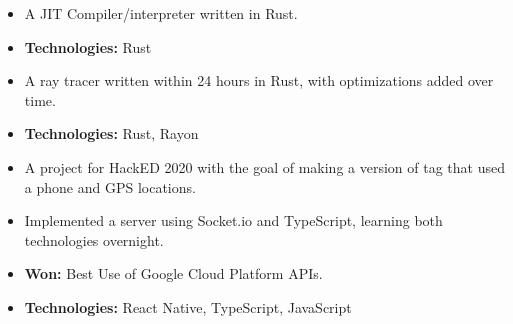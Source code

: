 \documentclass[10pt,a4paper,ragged2e]{resume-openfont}
\begin{document}
\begin{itemize}
  \item A JIT Compiler/interpreter written in Rust.
  \item \textbf{Technologies:} Rust
\end{itemize}
\divider\small

\begin{itemize}
  \item A ray tracer written within 24 hours in Rust, with optimizations added over time.
  \item \textbf{Technologies:} Rust, Rayon
\end{itemize}
\divider\small

\begin{itemize}
  \item A project for HackED 2020 with the goal of making a version of tag that used a phone and GPS locations.
  \item Implemented a server using Socket.io and TypeScript, learning both technologies overnight.
  \item \textbf{Won:} Best Use of Google Cloud Platform APIs.
  \item \textbf{Technologies:} React Native, TypeScript, JavaScript
\end{itemize}
\divider\small




\end{document}
